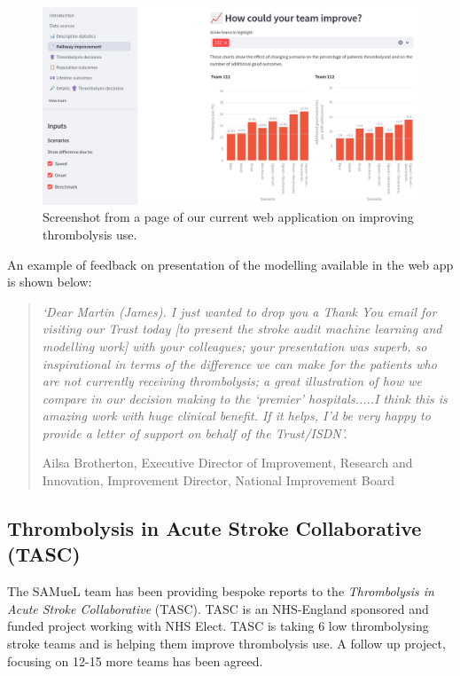 \begin{figure}
    \centering
    \includegraphics[width=0.75\linewidth]{images/web_app.png}
    \caption{Screenshot from a page of our current web application on improving thrombolysis use.}
    \label{fig:web_app}
\end{figure}

An example of feedback on presentation of the modelling available in the web app is shown below:

\begin{minipage}[t]{0.9\textwidth}
\begin{quote}
\textit{`Dear Martin (James). I just wanted to drop you a Thank You email for visiting our Trust today [to present the stroke audit machine learning and modelling work] with your colleagues; your presentation was superb, so inspirational in terms of the difference we can make for the patients who are not currently receiving thrombolysis; a great illustration of how we compare in our decision making to the ‘premier’ hospitals.....I think this is amazing work with huge clinical benefit. If it helps, I’d be very happy to provide a letter of support on behalf of the Trust/ISDN'.}

\vspace{5mm}

Ailsa Brotherton, Executive Director of Improvement, Research and Innovation, Improvement Director, National Improvement Board
\end{quote}
\end{minipage}

\subsection{Thrombolysis in Acute Stroke Collaborative (TASC)}

The SAMueL team has been providing bespoke reports to the \textit{Thrombolysis in Acute Stroke Collaborative} (TASC). TASC is an NHS-England sponsored and funded project working with NHS Elect. TASC is taking 6 low thrombolysing stroke teams and is helping them improve thrombolysis use. A follow up project, focusing on 12-15 more teams has been agreed.

